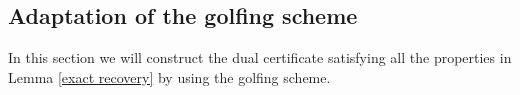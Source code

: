\documentclass[11pt]{article}
\newtheorem{lemma}[theorem]{Lemma}
\newcommand{\<}{\langle}
\renewcommand{\>}{\rangle}
\newcommand{\mtx}[1]{\bm{#1}}
\numberwithin{equation}{section}
\begin{document}
\subsection{Adaptation of the golfing scheme}
In this section we will construct the dual certificate satisfying all the properties in Lemma \ref{exact recovery} by using the golfing 
scheme. \\
\end{document}
